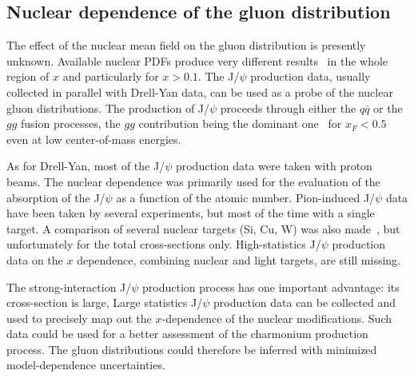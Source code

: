 \subsection{Nuclear dependence of the gluon distribution}

The effect of the nuclear mean field on the gluon distribution is presently unknown. Available nuclear PDFs produce 
very different results~\cite{Cazaroto:2008qh} in the whole region of $x$ and particularly for $x > 0.1$.
The J/$\psi$ production data, 
usually collected in parallel with Drell-Yan data, can be used as a probe of the nuclear gluon distributions. 
The production of J/$\psi$ proceeds through either the $q\bar q$ or the $gg$ fusion processes, the $gg$ 
contribution being the dominant one~\cite{Vogt:1999dw} for $x_F < 0.5$  even at low center-of-mass energies. 

As for Drell-Yan, most of the J/$\psi$ production data were taken with proton beams. The nuclear dependence 
was primarily used for the evaluation of the absorption of the J/$\psi$ as a function of the atomic number. 
Pion-induced J/$\psi$ data have been taken by several experiments, but most of the time with a single target. 
A comparison of several nuclear targets (Si, Cu, W) was also made~\cite{Alexandrov:1999ch},  
but unfortunately for the total cross-sections only. High-statistics J/$\psi$ production data on   
the $x$ dependence, combining nuclear and light targets, are still missing. 

The strong-interaction J/$\psi$ production process has one important advantage: its cross-section is large, 
Large statistics J/$\psi$ production data can be collected and 
used to precisely map out the $x$-dependence of the nuclear modifications. Such data could be 
used for a better assessment of the charmonium production process.  The gluon distributions could 
therefore be inferred with minimized model-dependence uncertainties.  

